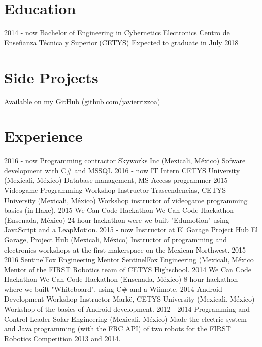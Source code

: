 \documentclass[]{friggeri-cv}
\newcommand{\Csh}{C{\lserif\#}}
\begin{document}
\section{Education}
  \entry
    {2014 - now}
    {Bachelor of Engineering in Cybernetics Electronics}
    {Centro de Enseñanza Técnica y Superior (CETYS)}
    {Expected to graduate in July 2018}

\section{Side Projects}
Available on my GitHub (\href{https://github.com/javierrizzoa}{github.com/javierrizzoa})

\section{Experience}
    \entry
    {2016 - now}
    {Programming contractor}
    {Skyworks Inc (Mexicali, México)}
    {Sofware development with \Csh{} and MSSQL}
    \entry
    {2016 - now}
    {IT Intern}
    {CETYS University (Mexicali, México)}
    {Database management, MS Access programmer}
    \entry
    {2015}
    {Videogame Programming Workshop Instructor}
    {Trascendencias, CETYS University (Mexicali, México)}
    {Workshop instructor of videogame programming basics (in Haxe).}
    \entry
    {2015}
    {We Can Code Hackathon}
    {We Can Code Hackathon (Ensenada, México)}
    {24-hour hackathon were we built "Edumotion" using JavaScript and a LeapMotion.}
    \entry
    {2015 - now}
    {Instructor at El Garage Project Hub}
    {El Garage, Project Hub (Mexicali, México)}
    {Instructor of programming and electronics workshops at the first makerspace on the Mexican Northwest.}
    \entry
    {2015 - 2016}
    {SentinelFox Engineering Mentor}
    {SentinelFox Engineering (Mexicali, México}
    {Mentor of the FIRST Robotics team of CETYS Highschool.}
    \entry
    {2014}
    {We Can Code Hackathon}
    {We Can Code Hackathon (Ensenada, México)}
    {8-hour hackathon where we built "Whiteboard", using \Csh{} and a Wiimote.}
    \entry
    {2014}
    {Android Development Workshop Instructor}
    {Markë, CETYS University (Mexicali, México)}
    {Workshop of the basics of Android development.}
    \entry
    {2012 - 2014}
    {Programming and Control Leader}
    {Solar Engineering (Mexicali, México)}
    {Made the electric system and Java programming (with the FRC API) of two robots for the FIRST Robotics Competition 2013 and 2014.}
\end{document}
